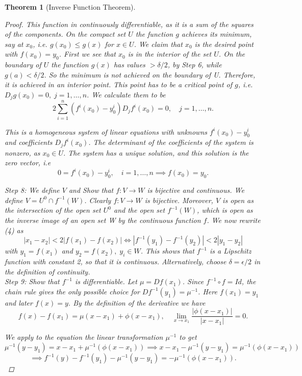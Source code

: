 \documentclass[12pt]{article}
\newtheorem{theorem}{Theorem}[section]
\begin{document}
\begin{theorem}[Inverse Function Theorem]
\begin{proof}
This function in continuously differentiable, as it is a sum of the squares of the components.
On the compact set $U$ the function $g$ achieves its minimum, say at $x_0$, i.e. $g(x_0) \leq g(x)$ for
$x \in U$. We claim that $x_0$ is the desired point with $f(x_0) = y_0$. First we see that $x_0$ is in the
interior of the set $U$. On the boundary of $U$ the function $g(x)$ has values $> \delta /2$, by Step 6,
while $g(a) < \delta /2$. So the minimum is not achieved on the boundary of U. Therefore, it is
achieved in an interior point. This point has to be a critical point of $g$, i.e. $D_j g(x_0) = 0,
\; j = 1, \dots , n$. We calculate them to be
\[ 2 \sum^{n}_{i=1}(f^i (x_0) - y^{i}_{0})D_{j}f^{i}(x_0) = 0, \quad j=1, \dots , n.\]

This is a homogeneous system of linear equations with unknowns $f^{i}(x_0) - y^{i}_{0}$ and coefficients $D_j f^{i}(x_0)$. The determinant of the coefficients of the system is nonzero, as $x_0 \in U$. The system has a unique solution, and this solution is the zero vector, i.e
\[ 0 = f^{i}(x_0) - y^{i}_{0}, \quad i=1, \dots, n \implies f(x_0) = y_{0}. \]

\textit{Step 8:} We define $V$ and Show that $f:V \rightarrow W$ is bijective and continuous. We define $V = U^0 \cap f^{-1} (W)$. Clearly $f : V \rightarrow W$ is bijective. Moreover, $V$ is open as the intersection of the open set $U^0$
and the open set $f^{-1} (W)$, which is open as the inverse image of an open set W by the continuous function $f$. We now rewrite (4) as
\begin{equation}
|x_1 - x_2 | < 2| f(x_1) - f(x_2)| \iff |f^{-1}(y_1)- f^{-1}(y_2)| < 2|y_1 - y_2 |
\end{equation}
with $y_1 = f(x_1)$ and $y_2 = f(x_2),\; y_i \in W$. This shows that $f^{-1}$ is a Lipschitz function with constant 2, so that it is continuous. Alternatively, choose $\delta = \epsilon /2$ in the definition of continuity.\\

\textit{Step 9:}  Show that $f^{-1}$ is differentiable. Let $\mu = Df(x_1)$. Since $f^{-1} \circ f = Id$, the chain
rule gives the only possible choice for $Df^{-1}(y_1)= \mu^{-1}$. Here $f(x_1) = y_1$ and later $f(x) = y$.
By the definition of the derivative we have
\[ f(x) - f(x_1) = \mu (x-x_1) + \phi(x-x_1), \quad \lim_{x \rightarrow x_1}\frac{|\phi(x - x_1)|}{|x - x_1|} = 0.\]

We apply to the equation the linear transformation $\mu^{-1}$ to get
\[ \mu^{-1}(y-y_1) = x - x_1 + \mu^{-1}(\phi(x - x_1)) \implies x - x_1 -\mu^{-1}(y-y_1) = \mu^{-1}(\phi(x - x_1)) \]
\[ \implies f^{-1}(y) - f^{-1}(y_1) - \mu^{-1}(y - y_1) = -\mu^{-1}(\phi(x-x_1)). \]


\end{proof}
\end{theorem}
\end{document}
